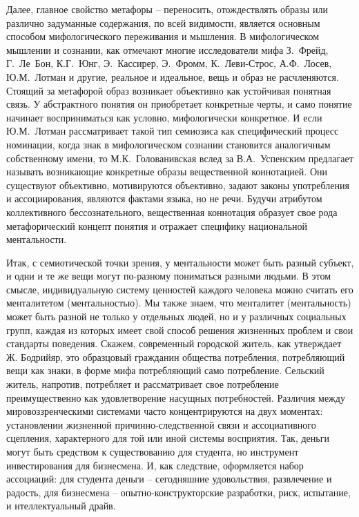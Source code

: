 Далее, главное свойство метафоры -- переносить, отождествлять образы или различно
задуманные содержания, по всей видимости, является основным способом мифологического
переживания и мышления. В мифологическом мышлении и сознании, как отмечают многие
исследователи мифа З.~Фрейд, Г.~Ле~Бон, К.Г.~Юнг, Э.~Кассирер, Э.~Фромм, К.~Леви-Строс,
А.Ф.~Лосев, Ю.М.~Лотман и другие, реальное и идеальное, вещь и образ не расчленяются.
Стоящий за метафорой образ возникает объективно как устойчивая понятная связь. У абстрактного
понятия он приобретает конкретные черты, и само понятие начинает восприниматься как условно,
мифологически конкретное. И если Ю.М.~Лотман рассматривает такой тип семиозиса как специфический
процесс номинации, когда знак в мифологическом сознании становится аналогичным собственному имени\autocite{name_culture},
то М.К.~Голованивская вслед за В.А.~Успенским предлагает называть возникающие конкретные образы
вещественной коннотацией.\autocite{uspensky} Они существуют объективно, мотивируются объективно,
задают законы употребления и ассоциирования, являются фактами языка, но не речи. Будучи атрибутом
коллективного бессознательного, вещественная коннотация образует свое рода метафорический концепт
понятия и отражает специфику национальной ментальности.

Итак, с семиотической точки зрения, у ментальности может быть разный субъект,
и одни и те же вещи могут по-разному пониматься разными людьми. В этом смысле, индивидуальную
систему ценностей каждого человека можно считать его менталитетом (ментальностью). Мы также знаем,
что менталитет (ментальность) может быть разной не только у отдельных людей, но и у различных
социальных групп, каждая из которых имеет свой способ решения жизненных проблем и свои стандарты поведения.
Скажем, современный городской житель, как утверждает Ж. Бодрийяр, это образцовый гражданин общества
потребления, потребляющий вещи как знаки, в форме мифа потребляющий само потребление.\autocite{bodriyar_society}
Сельский житель, напротив, потребляет и рассматривает свое потребление преимущественно как удовлетворение
насущных потребностей. Различия между мировоззренческими системами часто концентрируются на двух моментах:
установлении жизненной причинно-следственной связи и ассоциативного сцепления, характерного для той или
иной системы восприятия. Так, деньги могут быть средством к существованию для студента, но инструмент инвестирования
для бизнесмена. И, как следствие, оформляется набор ассоциаций: для студента деньги -- сегодняшние удовольствия,
развлечение и радость, для бизнесмена -- опытно-конструкторские разработки, риск, испытание, и
нтеллектуальный драйв.

